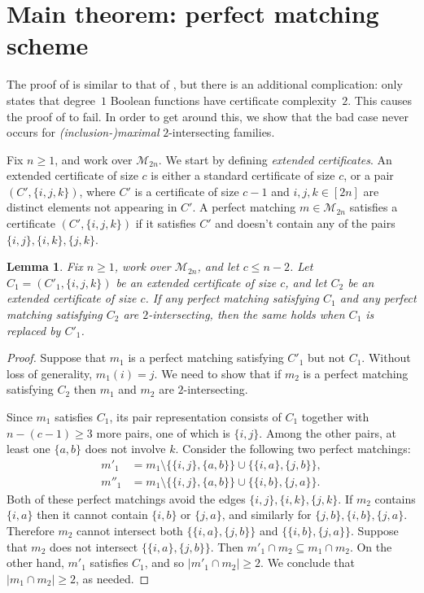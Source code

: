 \documentclass[10pt,a4paper]{amsart}
\newtheorem{lemma}[theorem]{Lemma}
\theoremstyle{definition}
\providecommand{\cM}{\mathcal{M}}
\begin{document}
\section{Main theorem: perfect matching scheme} \label{sec:main-pms}

The proof of  is similar to that of , but there is an additional complication:  only states that degree~$1$ Boolean functions have certificate complexity~$2$. This causes the proof of  to fail. In order to get around this, we show that the bad case never occurs for \emph{(inclusion-)maximal} $2$-intersecting families.

Fix $n \geq 1$, and work over $\cM_{2n}$. We start by defining \emph{extended certificates}. An extended certificate of size $c$ is either a standard certificate of size $c$, or a pair $(C',\{i,j,k\})$, where $C'$ is a certificate of size $c-1$ and $i,j,k \in [2n]$ are distinct elements not appearing in $C'$. A perfect matching $m \in \cM_{2n}$ satisfies a certificate $(C',\{i,j,k\})$ if it satisfies $C'$ and doesn't contain any of the pairs $\{i,j\},\{i,k\},\{j,k\}$.

\begin{lemma} \label{lem:extended-certificates}
Fix $n \geq 1$, work over $\cM_{2n}$, and let $c \leq n - 2$. Let $C_1 = (C'_1,\{i,j,k\})$ be an extended certificate of size $c$, and let $C_2$ be an extended certificate of size $c$. If any perfect matching satisfying $C_1$ and any perfect matching satisfying $C_2$ are $2$-intersecting, then the same holds when $C_1$ is replaced by $C'_1$.
\end{lemma}
\begin{proof}
Suppose that $m_1$ is a perfect matching satisfying $C'_1$ but not $C_1$. Without loss of generality, $m_1(i) = j$. We need to show that if $m_2$ is a perfect matching satisfying $C_2$ then $m_1$ and $m_2$ are $2$-intersecting.

Since $m_1$ satisfies $C_1$, its pair representation consists of $C_1$ together with $n-(c-1) \geq 3$ more pairs, one of which is $\{i,j\}$. Among the other pairs, at least one $\{a,b\}$ does not involve $k$. Consider the following two perfect matchings:
\begin{align*}
    m'_1 &= m_1 \setminus \bigl\{\{i,j\}, \{a,b\}\bigr\} \cup \bigl\{ \{i,a\}, \{j,b\} \bigr\}, \\
    m''_1 &= m_1 \setminus \bigl\{\{i,j\}, \{a,b\}\bigr\} \cup \bigl\{ \{i,b\}, \{j,a\} \bigr\}.
\end{align*}
Both of these perfect matchings avoid the edges $\{i,j\},\{i,k\},\{j,k\}$. If $m_2$ contains $\{i,a\}$ then it cannot contain $\{i,b\}$ or $\{j,a\}$, and similarly for $\{j,b\},\{i,b\},\{j,a\}$. Therefore $m_2$ cannot intersect both $\bigl\{ \{i,a\}, \{j,b\} \bigr\}$ and $\bigl\{ \{i,b\}, \{j,a\} \bigr\}$. Suppose that $m_2$ does not intersect $\bigl\{ \{i,a\}, \{j,b\} \bigr\}$. Then $m'_1 \cap m_2 \subseteq m_1 \cap m_2$. On the other hand, $m'_1$ satisfies $C_1$, and so $|m'_1 \cap m_2| \geq 2$. We conclude that $|m_1 \cap m_2| \geq 2$, as needed.
\end{proof}
\end{document}
